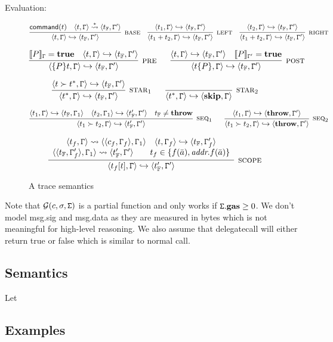 Evaluation:
\begin{figure}
$$
\infer[\rname{base}]{\conf{t,\cstate} \hookrightarrow \conf{t_{\mathbb{F}},\cstate'}}{\textsf{command}(t)~~~\conf{t,\cstate} \stackrel{*}{\leadsto} \conf{t_{\mathbb{F}},\cstate'}}
~~~
\infer[\rname{left}]{\conf{t_1+t_2,\cstate} \hookrightarrow \conf{t_{\mathbb{F}},\cstate'}}{\conf{t_1,\cstate} \hookrightarrow \conf{t_{\mathbb{F}},\cstate'}}
~~~
\infer[\rname{right}]{\conf{t_1+t_2,\cstate} \hookrightarrow \conf{t_{\mathbb{F}},\cstate'}}{\conf{t_2,\cstate} \hookrightarrow \conf{t_{\mathbb{F}},\cstate'}}
$$

$$
\infer[\rname{pre}]{\conf{\{P\}t,\cstate} \hookrightarrow \conf{t_{\mathbb{F}},\cstate'}}{\eval{P}_\cstate = \textbf{true}~~~\conf{t,\cstate} \hookrightarrow \conf{t_{\mathbb{F}},\cstate'}}
~~~~~
\infer[\rname{post}]{\conf{t\{P\},\cstate} \hookrightarrow \conf{t_{\mathbb{F}},\cstate'}}{\conf{t,\cstate} \hookrightarrow \conf{t_{\mathbb{F}},\cstate'}~~~\eval{P}_{\cstate'} = \textbf{true}}
$$

$$
\infer[\rname{star}_1]{\conf{t^*,\cstate} \hookrightarrow \conf{t_{\mathbb{F}},\cstate'}}{\conf{t \nxt t^*,\cstate} \hookrightarrow \conf{t_{\mathbb{F}},\cstate'}}
~~~~~
\infer[\rname{star}_2]{\conf{t^*,\cstate} \hookrightarrow \conf{\textbf{skip},\cstate}}{}
$$

$$
\infer[\rname{seq}_1]{\conf{t_1 \nxt t_2,\cstate} \hookrightarrow \conf{t_{\mathbb{F}}' ,\cstate'}}{\conf{t_1,\cstate} \hookrightarrow \conf{t_{\mathbb{F}},\cstate_1}~~~\conf{t_2,\cstate_1} \hookrightarrow \conf{t_{\mathbb{F}}',\cstate'}~~~t_\mathbb{F} \neq \textbf{throw}}
~~~~~
\infer[\rname{seq}_2]{\conf{t_1 \nxt t_2,\cstate} \hookrightarrow \conf{\textbf{throw} ,\cstate'}}{\conf{t_1,\cstate} \hookrightarrow \conf{\textbf{throw},\cstate'}}
$$

$$
\infer[\rname{scope}]{\conf{t_f[t],\cstate} \hookrightarrow \conf{t'_{\mathbb{F}},\cstate'}}
{
	\begin{array}{c}
	\conf{t_f,\cstate} \leadsto \conf{\conf{c_f,\cstate_f},\cstate_1}~~~\conf{t,\cstate_f} \hookrightarrow \conf{t_{\mathbb{F}},\cstate_f'}\\
	\conf{\conf{t_{\mathbb{F}},\cstate_f'},\cstate_1} \leadsto \conf{t'_{\mathbb{F}},\cstate'}~~~~~~t_f \in \{f(\bar{a}),\textit{addr}.f(\bar{a})\}
	\end{array}
}
$$
\caption{A trace semantics}\label{fig:tracesem}
\end{figure}



Note that $\mathcal{G}(c,\sigma,\mathtt{\Sigma})$ is a partial function and only works if $\mathtt{\Sigma}.\textbf{gas} \geq 0$. We don't model msg.sig and msg.data as they are measured in bytes which is not meaningful for high-level reasoning. We also assume that delegatecall will either return true or false which is similar to normal call.
\subsection{Semantics}

Let 

\subsection{Examples}
